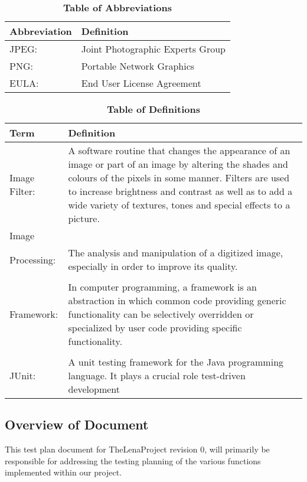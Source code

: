 \documentclass[12pt, titlepage]{article}
\begin{document}
\begin{table}[hbp]
\caption{\textbf{Table of Abbreviations}} \label{Table}

\begin{tabularx}{\textwidth}{p{3cm}X}
\toprule
\textbf{Abbreviation} & \textbf{Definition} \\
\midrule
JPEG: & Joint Photographic Experts Group\\
PNG:  & Portable Network Graphics\\
EULA: & End User License Agreement\\
\bottomrule
\end{tabularx}

\end{table}

\begin{table}[!htbp]
\caption{\textbf{Table of Definitions}} \label{Table}

\begin{tabularx}{\textwidth}{p{3cm}X}
\toprule
\textbf{Term} & \textbf{Definition}\\
\midrule

Image Filter: & A software routine that changes the appearance of an image or part of an image by altering the shades and colours of the pixels in some manner. Filters are used to increase brightness and contrast as well as to add a wide variety of textures, tones and special effects to a picture.\\ 
Image \\ Processing: & The analysis and manipulation of a digitized image, especially in order to improve its quality. \\
\\Framework: & In computer programming, a framework is an abstraction in which common code providing generic functionality can be selectively overridden or specialized by user code providing specific functionality.\\
\\JUnit: & A unit testing framework for the Java programming language. It plays a crucial role test-driven development\\


\bottomrule
\end{tabularx}

\end{table}	

\subsection{Overview of Document}
This test plan document for TheLenaProject revision 0, will primarily be responsible for addressing the testing planning of the various functions implemented within our project.
\end{document}
